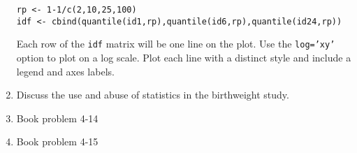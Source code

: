 \documentclass[11pt]{article}
\begin{document}
\begin{enumerate}
\begin{verbatim}
rp <- 1-1/c(2,10,25,100)
idf <- cbind(quantile(id1,rp),quantile(id6,rp),quantile(id24,rp))
\end{verbatim}

Each row of the \texttt{idf} matrix will be one line on the plot.  Use the \texttt{log='xy'} option to plot on a log scale.  Plot each line with a distinct style and include a legend and axes labels. 


\item Discuss the use and abuse of statistics in the birthweight study. 
\item Book problem 4-14
\item Book problem 4-15
\end{enumerate}
\end{document}
